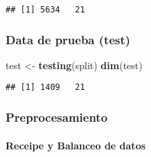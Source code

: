 \documentclass[
]{article}
\newenvironment{Shaded}{\begin{snugshade}}{\end{snugshade}}
\newcommand{\FunctionTok}[1]{\textcolor[rgb]{0.13,0.29,0.53}{\textbf{#1}}}
\newcommand{\NormalTok}[1]{#1}
\newcommand{\OtherTok}[1]{\textcolor[rgb]{0.56,0.35,0.01}{#1}}
\begin{document}
\begin{verbatim}
## [1] 5634   21
\end{verbatim}

\hypertarget{data-de-prueba-test}{%
\subsubsection{Data de prueba (test)}\label{data-de-prueba-test}}

\begin{Shaded}
\begin{Highlighting}[]
\NormalTok{test }\OtherTok{\textless{}{-}} \FunctionTok{testing}\NormalTok{(split)}
\FunctionTok{dim}\NormalTok{(test)}
\end{Highlighting}
\end{Shaded}

\begin{verbatim}
## [1] 1409   21
\end{verbatim}

\hypertarget{preprocesamiento}{%
\subsubsection{Preprocesamiento}\label{preprocesamiento}}

\hypertarget{receipe-y-balanceo-de-datos}{%
\paragraph{Receipe y Balanceo de
datos}\label{receipe-y-balanceo-de-datos}}
\end{document}
